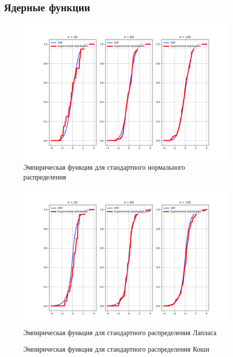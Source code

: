 \documentclass[a4]{article}
\begin{document}
\subsection{Ядерные функции}
\begin{center}
\begin{figure}[H]
	\caption{Эмпирическая функция для стандартного нормального распределения}
	\includegraphics[width=\textwidth]{normal_cdf.png}
\end{figure}
\begin{figure}[H]
	\caption{Эмпирическая функция для стандартного распределения Лапласа}
	\includegraphics[width=\textwidth]{laplace_cdf.png}
\end{figure}
\begin{figure}[H]
	\caption{Эмпирическая функция для стандартного распределения Коши}

\end{figure}
\end{center}
\end{document}
